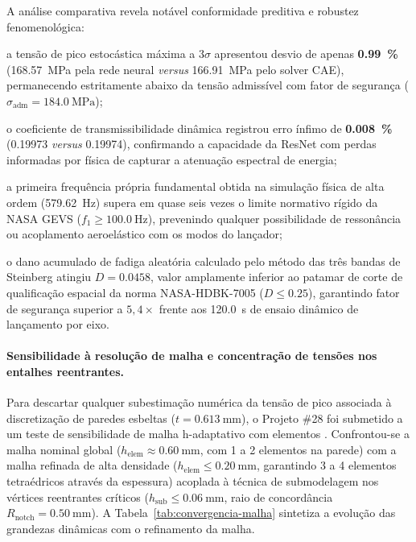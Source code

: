 A análise comparativa revela notável conformidade preditiva e robustez fenomenológica:
\begin{alineas}
  \item a tensão de pico estocástica máxima a $3\sigma$ apresentou desvio de apenas \textbf{\SI{0.99}{\percent}} (\SI{168.57}{\mega\pascal} pela rede neural \textit{versus} \SI{166.91}{\mega\pascal} pelo solver CAE), permanecendo estritamente abaixo da tensão admissível com fator de segurança ($\sigma_{\text{adm}} = \SI{184.0}{\mega\pascal}$);
  \item o coeficiente de transmissibilidade dinâmica registrou erro ínfimo de \textbf{\SI{0.008}{\percent}} (\num{0.19973} \textit{versus} \num{0.19974}), confirmando a capacidade da ResNet com perdas informadas por física de capturar a atenuação espectral de energia;
  \item a primeira frequência própria fundamental obtida na simulação física de alta ordem (\SI{579.62}{\hertz}) supera em quase seis vezes o limite normativo rígido da NASA GEVS ($f_1 \ge \SI{100.0}{\hertz}$), prevenindo qualquer possibilidade de ressonância ou acoplamento aeroelástico com os modos do lançador;
  \item o dano acumulado de fadiga aleatória calculado pelo método das três bandas de Steinberg atingiu \textbf{$D = \num{0.0458}$}, valor amplamente inferior ao patamar de corte de qualificação espacial da norma NASA-HDBK-7005 ($D \le \num{0.25}$), garantindo fator de segurança superior a $5{,}4\times$ frente aos \SI{120.0}{\second} de ensaio dinâmico de lançamento por eixo.
\end{alineas}

\paragraph*{Sensibilidade à resolução de malha e concentração de tensões nos entalhes reentrantes.}
Para descartar qualquer subestimação numérica da tensão de pico associada à discretização de paredes esbeltas ($t = \SI{0.613}{\milli\metre}$), o Projeto \#28 foi submetido a um teste de sensibilidade de malha h-adaptativo com elementos . Confrontou-se a malha nominal global ($h_{\text{elem}} \approx \SI{0.60}{\milli\metre}$, com 1 a 2 elementos na parede) com a malha refinada de alta densidade ($h_{\text{elem}} \le \SI{0.20}{\milli\metre}$, garantindo 3 a 4 elementos tetraédricos através da espessura) acoplada à técnica de submodelagem nos vértices reentrantes críticos ($h_{\text{sub}} \le \SI{0.06}{\milli\metre}$, raio de concordância $R_{\text{notch}} = \SI{0.50}{\milli\metre}$). A Tabela~\ref{tab:convergencia-malha} sintetiza a evolução das grandezas dinâmicas com o refinamento da malha.

